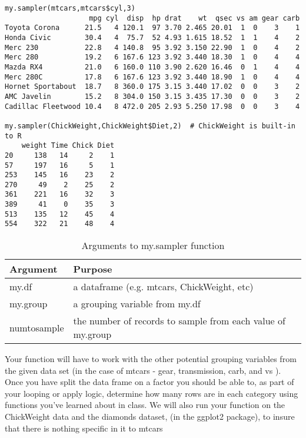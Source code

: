 \documentclass{article}
\begin{document}
\begin{verbatim}
my.sampler(mtcars,mtcars$cyl,3)
                    mpg cyl  disp  hp drat    wt  qsec vs am gear carb
Toyota Corona      21.5   4 120.1  97 3.70 2.465 20.01  1  0    3    1
Honda Civic        30.4   4  75.7  52 4.93 1.615 18.52  1  1    4    2
Merc 230           22.8   4 140.8  95 3.92 3.150 22.90  1  0    4    2
Merc 280           19.2   6 167.6 123 3.92 3.440 18.30  1  0    4    4
Mazda RX4          21.0   6 160.0 110 3.90 2.620 16.46  0  1    4    4
Merc 280C          17.8   6 167.6 123 3.92 3.440 18.90  1  0    4    4
Hornet Sportabout  18.7   8 360.0 175 3.15 3.440 17.02  0  0    3    2
AMC Javelin        15.2   8 304.0 150 3.15 3.435 17.30  0  0    3    2
Cadillac Fleetwood 10.4   8 472.0 205 2.93 5.250 17.98  0  0    3    4

my.sampler(ChickWeight,ChickWeight$Diet,2)  # ChickWeight is built-in to R
    weight Time Chick Diet
20     138   14     2    1
57     197   16     5    1
253    145   16    23    2
270     49    2    25    2
361    221   16    32    3
389     41    0    35    3
513    135   12    45    4
554    322   21    48    4
\end{verbatim}

\begin{table}[ht]
\caption{Arguments to my.sampler function}
\begin{tabular}{l | l}
\hline\hline
Argument & Purpose \\ [1ex]
\hline
my.df & a dataframe (e.g. mtcars, ChickWeight, etc) \\ [1ex]
\hline 
my.group & a grouping variable from my.df \\ [1ex]
\hline
numtosample & the number of records to sample from each value of my.group \\ [1ex]
\hline 
\end{tabular}
\label{table:nonlin}
\end{table}


Your function will have to work with the other potential grouping variables from the given data set (in the case of mtcars - gear, transmission,  carb, and vs ). Once you have split the data frame on a factor you should be able to, as part of your looping or apply logic, determine how many rows are in each category using functions you've learned about in class. We will also run your function on the ChickWeight data and the diamonds dataset, (in the ggplot2 package), to insure that there is nothing specific in it to mtcars
\\
\end{document}
